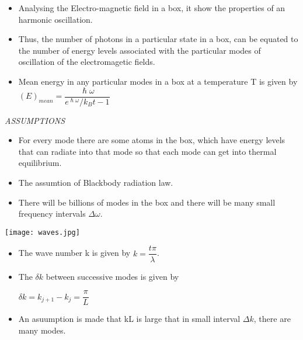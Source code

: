 \documentclass[aspectratio=169]{beamer}
\begin{document}
\begin{frame}
	\begin{itemize}
		\item Analysing the Electro-magnetic field in a box, it show the properties of an harmonic oscillation.
		\item Thus, the number of photons in a particular state in a box, can be equated to the number of energy levels associated with the particular modes of oscillation of the electromagetic fields. 
	\end{itemize}
\end{frame}

\begin{frame}
	\begin{itemize}
		\item Mean energy in any particular modes in a box at a temperature T is given by  \newline
		\center $(E)_{mean} = \dfrac{\hslash\omega}{e^{\hslash\omega}/{k_{B}t} - 1}$\newline
	\end{itemize}
\end{frame} 


\begin{frame}
\textit{ASSUMPTIONS}
	\begin{itemize}
		
		\item For every mode there are some atoms in the box, which have energy levels that can radiate into that mode so that each mode can get into thermal equilibrium.
		\item The assumtion of Blackbody radiation law. 
	\end{itemize}
\end{frame}

\begin{frame}
	\begin{itemize}
		\item There will be billions of modes in the box and there will be many small frequency intervals $\Delta\omega$.
		
	\end{itemize}
	 \center \texttt{[image: waves.jpg]}
\end{frame}

\begin{frame}
	\begin{itemize}
		\item The wave number k is given by $k = \dfrac{t\pi}{\lambda}$.
		\item The $\delta k$ between successive modes is given by \newline
		
			$ \delta k = k_{j+1} - k_{j} = \dfrac{\pi}{L}$\newline
			
		\item An asuumption is made that kL is large that in small interval $\Delta k$, there are many modes. 	
		
		 
	\end{itemize}
\end{frame}
\end{document}
